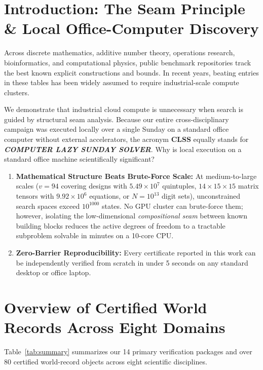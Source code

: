 \documentclass[11pt,a4paper]{article}
\begin{document}
\section{Introduction: The Seam Principle \& Local Office-Computer Discovery}

Across discrete mathematics, additive number theory, operations research, bioinformatics, and computational physics, public benchmark repositories track the best known explicit constructions and bounds. In recent years, beating entries in these tables has been widely assumed to require industrial-scale compute clusters.

We demonstrate that industrial cloud compute is unnecessary when search is guided by structural seam analysis. Because our entire cross-disciplinary campaign was executed locally over a single Sunday on a standard office computer without external accelerators, the acronym \textbf{CLSS} equally stands for \textbf{\emph{COMPUTER LAZY SUNDAY SOLVER}}. Why is local execution on a standard office machine scientifically significant?
\begin{enumerate}\itemsep=1pt
    \item \textbf{Mathematical Structure Beats Brute-Force Scale:} At medium-to-large scales ($v=94$ covering designs with $5.49 \times 10^7$ quintuples, $14 \times 15 \times 15$ matrix tensors with $9.92 \times 10^6$ equations, or $N=10^{13}$ digit sets), unconstrained search spaces exceed $10^{1000}$ states. No GPU cluster can brute-force them; however, isolating the low-dimensional \emph{compositional seam} between known building blocks reduces the active degrees of freedom to a tractable subproblem solvable in minutes on a 10-core CPU.
    \item \textbf{Zero-Barrier Reproducibility:} Every certificate reported in this work can be independently verified from scratch in under 5 seconds on any standard desktop or office laptop.
\end{enumerate}

\section{Overview of Certified World Records Across Eight Domains}

Table~\ref{tab:summary} summarizes our 14 primary verification packages and over 80 certified world-record objects across eight scientific disciplines.
\end{document}
